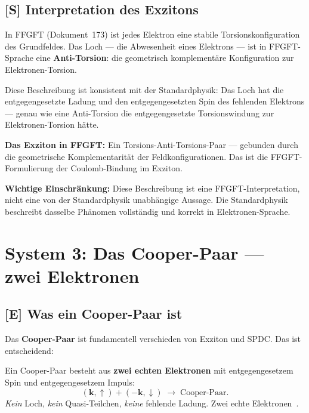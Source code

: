 \subsection{[S] Interpretation des Exzitons}

\begin{foundation}
In FFGFT (Dokument~173) ist jedes Elektron eine
stabile Torsionskonfiguration des Grundfeldes.
Das Loch --- die Abwesenheit eines Elektrons --- ist
in FFGFT-Sprache eine \textbf{Anti-Torsion}:
die geometrisch komplementäre Konfiguration zur Elektronen-Torsion.

Diese Beschreibung ist konsistent mit der Standardphysik:
Das Loch hat die entgegengesetzte Ladung und den
entgegengesetzten Spin des fehlenden Elektrons ---
genau wie eine Anti-Torsion die entgegengesetzte
Torsionswindung zur Elektronen-Torsion hätte.

\textbf{Das Exziton in FFGFT:}
Ein Torsions-Anti-Torsions-Paar --- gebunden durch
die geometrische Komplementarität der Feldkonfigurationen.
Das ist die FFGFT-Formulierung der Coulomb-Bindung im Exziton.

\textbf{Wichtige Einschränkung:}
Diese Beschreibung ist eine FFGFT-Interpretation,
nicht eine von der Standardphysik unabhängige Aussage.
Die Standardphysik beschreibt dasselbe Phänomen vollständig
und korrekt in Elektronen-Sprache.
\end{foundation}

\section{System 3: Das Cooper-Paar --- zwei Elektronen}
\label{sec:cooper}

\subsection{[E] Was ein Cooper-Paar ist}

Das \textbf{Cooper-Paar} ist fundamentell verschieden
von Exziton und SPDC. Das ist entscheidend:

\begin{keyresult}[STANDARD: Cooper-Paar = zwei echte Elektronen]
Ein Cooper-Paar besteht aus \textbf{zwei echten Elektronen}
mit entgegengesetzem Spin und entgegengesetzem Impuls:
\begin{equation}
  (\mathbf{k}, \uparrow) + (-\mathbf{k}, \downarrow)
  \;\longrightarrow\; \text{Cooper-Paar}.
\end{equation}
\textit{Kein} Loch, \textit{kein} Quasi-Teilchen, \textit{keine} fehlende Ladung.
Zwei echte Elektronen~\cite{Cooper1956,BCS1957}.
\end{keyresult}

